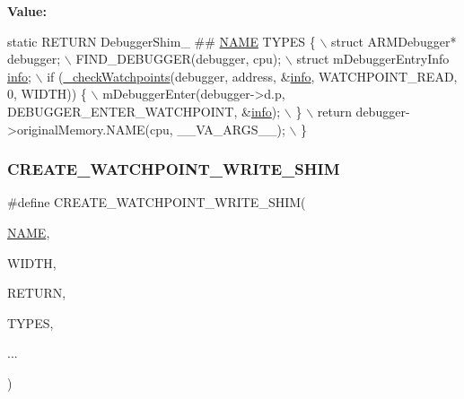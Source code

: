 {\bfseries Value\+:}
\begin{DoxyCode}
\textcolor{keyword}{static} RETURN DebuggerShim\_ ## \mbox{\hyperlink{inflate_8h_a164ea0159d5f0b5f12a646f25f99eceaa67bc2ced260a8e43805d2480a785d312}{NAME}} TYPES \{ \(\backslash\)
        struct ARMDebugger* debugger; \(\backslash\)
        FIND\_DEBUGGER(debugger, cpu); \(\backslash\)
        struct mDebuggerEntryInfo \mbox{\hyperlink{libretro_8h_a283ad41e4809f9c0ebe736a9861d8a91}{info}}; \(\backslash\)
        if (\mbox{\hyperlink{arm_2debugger_2memory-debugger_8c_af27e1b9541b0d441825fffdc4d3ad7fb}{\_checkWatchpoints}}(debugger, address, &\mbox{\hyperlink{libretro_8h_structretro__game__info}{info}}, WATCHPOINT\_READ, 0, WIDTH)) \{ 
      \(\backslash\)
            mDebuggerEnter(debugger->d.p, DEBUGGER\_ENTER\_WATCHPOINT, &\mbox{\hyperlink{libretro_8h_structretro__game__info}{info}}); \(\backslash\)
        \} \(\backslash\)
        return debugger->originalMemory.NAME(cpu, \_\_VA\_ARGS\_\_); \(\backslash\)
    \}
\end{DoxyCode}
\mbox{\label{arm_2debugger_2memory-debugger_8c_af7ff0881f887c0f2ce839fa3e91646d6}} 
\subsubsection{\texorpdfstring{C\+R\+E\+A\+T\+E\+\_\+\+W\+A\+T\+C\+H\+P\+O\+I\+N\+T\+\_\+\+W\+R\+I\+T\+E\+\_\+\+S\+H\+IM}{CREATE\_WATCHPOINT\_WRITE\_SHIM}}
{\footnotesize\ttfamily \#define C\+R\+E\+A\+T\+E\+\_\+\+W\+A\+T\+C\+H\+P\+O\+I\+N\+T\+\_\+\+W\+R\+I\+T\+E\+\_\+\+S\+H\+IM(\begin{DoxyParamCaption}\item[{}]{\mbox{\hyperlink{inflate_8h_a164ea0159d5f0b5f12a646f25f99eceaa67bc2ced260a8e43805d2480a785d312}{N\+A\+ME}},  }\item[{}]{W\+I\+D\+TH,  }\item[{}]{R\+E\+T\+U\+RN,  }\item[{}]{T\+Y\+P\+ES,  }\item[{}]{... }\end{DoxyParamCaption})}

